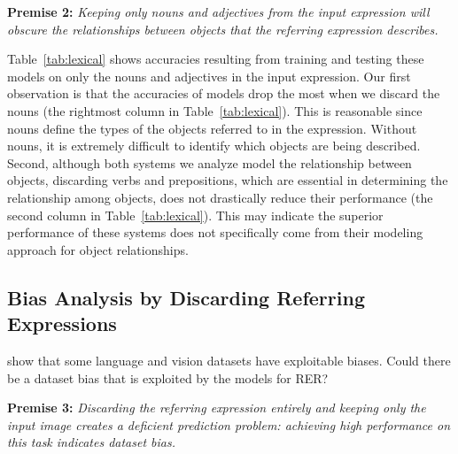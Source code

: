 \documentclass[11pt,a4paper]{article}
\begin{document}
\noindent\textbf{Premise 2:} \textit{Keeping only nouns and adjectives from the input expression will obscure the relationships between objects that the referring expression describes.}

Table~\ref{tab:lexical} shows accuracies resulting from training and testing these models on only the nouns and adjectives in the input expression. Our first observation is that the accuracies of models drop the most when we discard the nouns (the rightmost column in Table~\ref{tab:lexical}).
\tablesix
This is reasonable since nouns define the types of the objects referred to in the expression. Without nouns, it is extremely difficult to identify which objects are being described.
Second, although both systems we analyze model the relationship between objects, discarding verbs and prepositions, which are essential in determining the relationship among objects, does not drastically reduce their performance (the second column in Table~\ref{tab:lexical}).
This may indicate the superior performance of these systems does not specifically come from their 
modeling approach for object relationships.

\subsection{Bias Analysis by Discarding Referring Expressions}\label{ssec:refexp}%
\citet{goyal2016making} show that some language and vision datasets have exploitable biases. 
Could there be a dataset bias that is exploited by the models for RER?

\noindent\textbf{Premise 3:} \textit{ Discarding the referring expression entirely and keeping only the input image creates a deficient prediction problem: achieving high performance on this task indicates dataset bias.}
\end{document}
